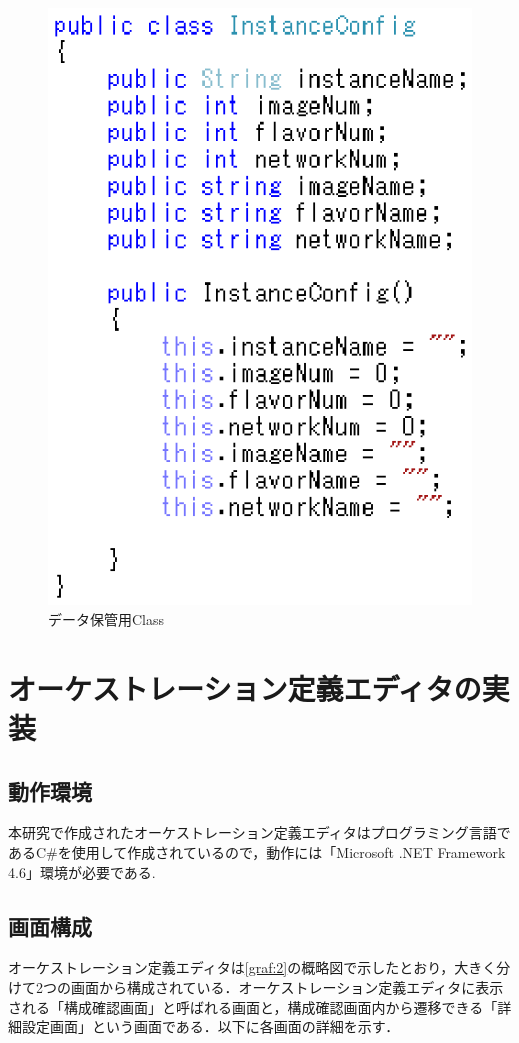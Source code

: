 \documentclass[mingoth]{kut-paper}		%
\begin{document}
	\begin{figure}[H]
		\begin{center}
			\includegraphics[scale=0.86]{Document/Source1.eps}
			\caption{データ保管用Class}
			\label{graf:3}
		\end{center}
	\end{figure}
	
\chapter{オーケストレーション定義エディタの実装}
	\section{動作環境}
	本研究で作成されたオーケストレーション定義エディタはプログラミング言語であるC\#を使用して作成されているので，動作には「Microsoft .NET Framework 4.6」環境が必要である.
	\section{画面構成}
	オーケストレーション定義エディタは\ref{graf:2}の概略図で示したとおり，大きく分けて2つの画面から構成されている．オーケストレーション定義エディタに表示される「構成確認画面」と呼ばれる画面と，構成確認画面内から遷移できる「詳細設定画面」という画面である．以下に各画面の詳細を示す．
	\newpage
\end{document}
